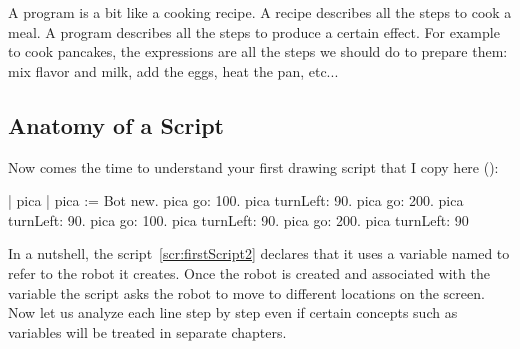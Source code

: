 A program is a bit like a cooking recipe. A recipe describes all the steps to cook a meal. A program describes all the steps to produce a certain effect. For example to cook pancakes, the expressions are all the steps we should do to prepare them: mix flavor and milk, add the eggs, heat the pan, etc...

\subsection{Anatomy of a Script}
Now comes the time to understand your first drawing script that I copy here ():

\begin{scriptwithouttitle}\label{scr:firstScript2}
| pica |
pica := Bot new.
pica go: 100.
pica turnLeft: 90.
pica go: 200.
pica turnLeft: 90.
pica go: 100.
pica turnLeft: 90.
pica go: 200.
pica turnLeft: 90
\end{scriptwithouttitle}


In a nutshell, the script~\ref{scr:firstScript2} declares that it uses a variable named   to refer to the robot it creates. Once the robot is created and associated with the variable  the script asks the robot to move to different locations on the screen.  Now let us analyze each line step by step even if certain concepts such as variables will be treated in separate chapters.
  
